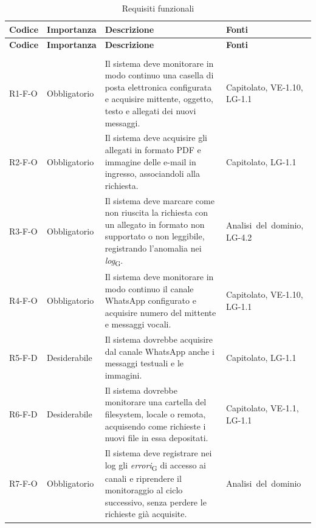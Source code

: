 {
    \small
    \renewcommand{\arraystretch}{1.3}
    \begin{longtable}{|>{\raggedright\arraybackslash}p{1.8cm}|>{\raggedright\arraybackslash}p{2.3cm}|>{\raggedright\arraybackslash}p{6.6cm}|>{\raggedright\arraybackslash}p{3.1cm}|}
    \caption{Requisiti funzionali}\label{tab:req-funzionali}\\
    \hline
    \rowcolor[gray]{0.88} \textbf{Codice} & \textbf{Importanza} & \textbf{Descrizione} & \textbf{Fonti} \\ \hline
    \endfirsthead
    \hline
    \rowcolor[gray]{0.88} \textbf{Codice} & \textbf{Importanza} & \textbf{Descrizione} & \textbf{Fonti} \\ \hline
    \endhead
    \multicolumn{4}{|l|}{\cellcolor[gray]{0.94}\textbf{Macroarea 1 --- Acquisizione delle richieste dai canali}} \\ \hline
    \mbox{R1-F-O} & Obbligatorio & Il sistema deve monitorare in modo continuo una casella di posta elettronica configurata e acquisire mittente, oggetto, testo e allegati dei nuovi messaggi. & \mbox{Capitolato}, \mbox{VE-1.10}, \mbox{LG-1.1} \\ \hline
    \mbox{R2-F-O} & Obbligatorio & Il sistema deve acquisire gli allegati in formato PDF e immagine delle e-mail in ingresso, associandoli alla richiesta. & \mbox{Capitolato}, \mbox{LG-1.1} \\ \hline
    \mbox{R3-F-O} & Obbligatorio & Il sistema deve marcare come non riuscita la richiesta con un allegato in formato non supportato o non leggibile, registrando l'anomalia nei \textit{log}\textsubscript{G}. & \mbox{Analisi del dominio}, \mbox{LG-4.2} \\ \hline
    \mbox{R4-F-O} & Obbligatorio & Il sistema deve monitorare in modo continuo il canale WhatsApp configurato e acquisire numero del mittente e messaggi vocali. & \mbox{Capitolato}, \mbox{VE-1.10}, \mbox{LG-1.1} \\ \hline
    \mbox{R5-F-D} & Desiderabile & Il sistema dovrebbe acquisire dal canale WhatsApp anche i messaggi testuali e le immagini. & \mbox{Capitolato}, \mbox{LG-1.1} \\ \hline
    \mbox{R6-F-D} & Desiderabile & Il sistema dovrebbe monitorare una cartella del filesystem, locale o remota, acquisendo come richieste i nuovi file in essa depositati. & \mbox{Capitolato}, \mbox{VE-1.1}, \mbox{LG-1.1} \\ \hline
    \mbox{R7-F-O} & Obbligatorio & Il sistema deve registrare nei log gli \textit{errori}\textsubscript{G} di accesso ai canali e riprendere il monitoraggio al ciclo successivo, senza perdere le richieste già acquisite. & \mbox{Analisi del dominio} \\ \hline

\end{longtable}}
